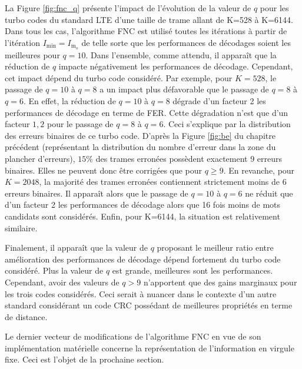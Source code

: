 La Figure \ref{fig:fnc_q} présente l'impact de l'évolution de la valeur de $q$ pour les turbo codes du standard LTE 
d'une taille de trame allant de K=528 à K=6144. Dans tous les cas, l'algorithme FNC est utilisé toutes les itérations à 
partir de l'itération $I_\text{min} = I_{\text{m}_\text{o}}$ de telle sorte que les performances de décodages 
soient les meilleures pour $q=10$. Dans l'ensemble, comme attendu, il apparaît que la réduction de $q$ impacte 
négativement les performances de décodage. Cependant, cet impact dépend du turbo code considéré. Par exemple, pour 
$K=528$, le passage de $q=10$ à $q=8$ a un impact plus défavorable que le passage de $q=8$ à $q=6$. 
En effet, la réduction de $q=10$ à $q=8$ dégrade d'un facteur 2 les performances de décodage en terme de FER. Cette dégradation n'est que 
d'un facteur $1,2$ pour le passage de $q=8$ à $q=6$.
Ceci s'explique par
la distribution des erreurs binaires de ce turbo code. 
D'après la Figure \ref{fig:be} du chapitre précédent (représentant la distribution du nombre d'erreur dans la zone du 
plancher d'erreurs), $15\%$ des trames erronées possèdent exactement 9 erreurs binaires. 
Elles ne peuvent donc être corrigées que pour $q\geq 9$. 
En revanche, pour $K=2048$, la majorité des trames erronées contiennent strictement moins de 6 erreurs binaires.
Il apparaît alors que le passage de $q=10$ à $q=6$ ne réduit que d'un facteur 2 les performances de décodage alors que 
16 fois moins de mots candidats sont considérés.
Enfin, pour K=6144, la situation est relativement similaire.

Finalement, il apparaît que la valeur de $q$ proposant le meilleur ratio entre amélioration des performances de décodage 
dépend fortement du turbo code considéré. Plus la valeur de $q$ est grande, meilleures sont les performances. Cependant,
avoir des valeurs de $q>9$ n'apportent que des gains marginaux pour les trois codes considérés. Ceci serait à nuancer dans le contexte 
d'un autre standard considérant un code CRC possédant de meilleures propriétés en terme de distance.

Le dernier vecteur de modifications de l'algorithme FNC en vue de son implémentation matérielle concerne la représentation de 
l'information en virgule fixe. Ceci est l'objet de la prochaine section.

